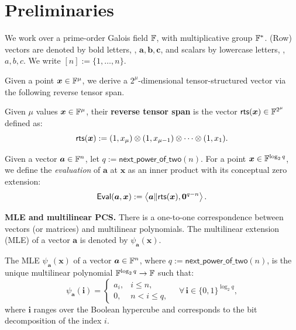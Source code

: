 \section{Preliminaries}
\label{sec:preliminary}

We work over a prime-order Galois field ${\mathbb{F}}$,
with multiplicative group ${\mathbb{F}}^*$.
(Row) vectors are denoted by bold letters,
\eg, $\bm{a}, \bm{b}, \bm{c}$,
and scalars by lowercase letters, \eg, $a, b, c$.
We write $[n] := \{1, \ldots, n\}$.

Given a point $\bm{x}\in {\mathbb{F}}^\mu$,
we derive a $2^\mu$-dimensional tensor-structured vector
via the following reverse tensor span.

\begin{definition}
	\label{def:tensorspan}
	Given $\mu$ values $\bm{x} \in {\mathbb{F}}^\mu$,
	their \textbf{reverse tensor span} is the vector
	${\sf rts}(\bm{x}) \in {\mathbb{F}}^{2^\mu}$ defined as:
	\[
		{\sf rts}(\bm{x})
		:= (1, x_\mu) \mathbin{\otimes} (1, x_{\mu - 1}) \mathbin{\otimes} \cdots \mathbin{\otimes} (1, x_1).
	\]
\end{definition}

Given a vector $\bm{a} \in {\mathbb{F}}^n$, let
$q:=\mathsf{next\_power\_of\_two}(n)$.  For a point
$\bm{x} \in {\mathbb{F}}^{\log_2 q}$, we define the \emph{evaluation} of $\bm{a}$ at
$\bm{x}$ as an inner product with its conceptual zero extension:
\begin{equation}
\label{eq:evaluation}
    \mathsf{Eval}(\bm{a}, \bm{x})
    := \left\langle \bm{a}\| {\sf rts}(\bm{x}),\bm{0}^{q-n} \right\rangle.
\end{equation}

\mysmallskip
\noindent
\textbf{MLE and multilinear PCS.}
There is a one-to-one correspondence between vectors (or matrices)
and multilinear polynomials.
The multilinear extension (MLE) of a vector $\bm{a}$
is denoted by $\psi_{\bm{a}}(\bm{x})$.

\begin{definition}
The MLE $\psi_{\bm{a}}(\bm{x})$ of a vector $\bm{a} \in {\mathbb{F}}^{n}$, where
$q:=\mathsf{next\_power\_of\_two}(n)$, is the unique multilinear polynomial
${\mathbb{F}}^{\log_2 q} \to {\mathbb{F}}$
such that:
\[
	\psi_{\bm{a}} (\bm{i}) =
    \begin{cases}a_i,&i\le n,\\0,&n<i\le q,\end{cases}
	\quad \forall\, \bm{i} \in \{0, 1\}^{\log_2 q},
\]
where $\bm{i}$ ranges over the Boolean hypercube
and corresponds to the bit decomposition of the index $i$.
\end{definition}

